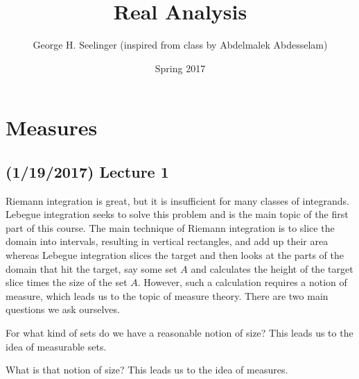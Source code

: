 \documentclass[11pt,leqno,oneside]{amsbook}
\title[Real Analysis]{Real Analysis}
\author{George H. Seelinger (inspired from class by Abdelmalek Abdesselam)}
\date{Spring 2017}
\numberwithin{thm}{section}
\begin{document}
\maketitle
\section{Measures}
\subsection*{(1/19/2017) Lecture 1}
Riemann integration is great, but it is insufficient for many classes
of integrands. Lebegue integration seeks to solve this problem and is
the main topic of the first part of this course. The main technique of
Riemann integration is to slice the domain into intervals, resulting in vertical rectangles, and add up
their area whereas Lebegue integration slices the target and then
looks at the parts of the domain that hit the target, say some set $A$
and calculates the height of the target slice times the size of the set
$A$. However, such a calculation requires a notion of measure, which
leads us to the topic of measure theory. There are two main questions
we ask ourselves.
\begin{thm}[Question]
  For what kind of sets do we have a reasonable notion of size? This
  leads us to the idea of measurable sets.
\end{thm}
\begin{thm}[Question]
  What is that notion of size? This leads us to the idea of measures.
\end{thm}
\end{document}

